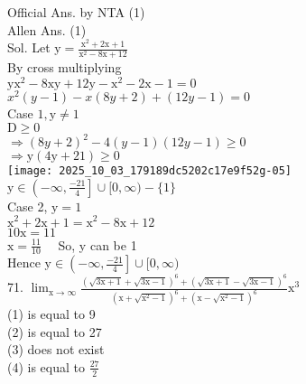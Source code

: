 \documentclass[10pt]{article}
\begin{document}
Official Ans. by NTA (1)\\
Allen Ans. (1)\\
Sol. Let \(\mathrm{y}=\frac{\mathrm{x}^{2}+2 \mathrm{x}+1}{\mathrm{x}^{2}-8 \mathrm{x}+12}\)\\
By cross multiplying\\
\(\mathrm{yx}^{2}-8 \mathrm{xy}+12 \mathrm{y}-\mathrm{x}^{2}-2 \mathrm{x}-1=0\)\\
\(x^{2}(y-1)-x(8 y+2)+(12 y-1)=0\)\\
Case \(1, \mathrm{y} \neq 1\)\\
\(\mathrm{D} \geq 0\)\\
\(\Rightarrow(8 y+2)^{2}-4(y-1)(12 y-1) \geq 0\)\\
\(\Rightarrow \mathrm{y}(4 \mathrm{y}+21) \geq 0\)\\
\texttt{[image: 2025\_10\_03\_179189dc5202c17e9f52g-05]}\\
\(\mathrm{y} \in\left(-\infty, \frac{-21}{4}\right] \cup[0, \infty)-\{1\}\)\\
Case 2, \(\mathrm{y}=1\)\\
\(\mathrm{x}^{2}+2 \mathrm{x}+1=\mathrm{x}^{2}-8 \mathrm{x}+12\)\\
\(10 \mathrm{x}=11\)\\
\(\mathrm{x}=\frac{11}{10} \quad\) So, y can be 1\\
Hence \(\mathrm{y} \in\left(-\infty, \frac{-21}{4}\right] \cup[0, \infty)\)\\
71. \(\lim _{\mathrm{x} \rightarrow \infty} \frac{(\sqrt{3 \mathrm{x}+1}+\sqrt{3 \mathrm{x}-1})^{6}+(\sqrt{3 \mathrm{x}+1}-\sqrt{3 \mathrm{x}-1})^{6}}{\left(\mathrm{x}+\sqrt{\mathrm{x}^{2}-1}\right)^{6}+\left(\mathrm{x}-\sqrt{\mathrm{x}^{2}-1}\right)^{6}} \mathrm{x}^{3}\)\\
(1) is equal to 9\\
(2) is equal to 27\\
(3) does not exist\\
(4) is equal to \(\frac{27}{2}\)
\end{document}
